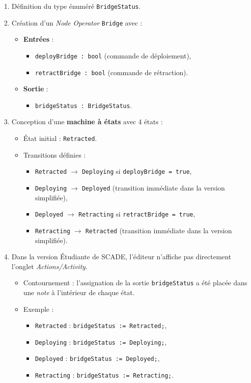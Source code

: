 \documentclass[11pt,a4paper]{report}
\begin{document}
\begin{enumerate}
  \item Définition du type énuméré \texttt{BridgeStatus}.
  \item Création d’un \textit{Node Operator} \texttt{Bridge} avec :
  \begin{itemize}
    \item \textbf{Entrées} :
      \begin{itemize}
        \item \texttt{deployBridge : bool} (commande de déploiement),
        \item \texttt{retractBridge : bool} (commande de rétraction).
      \end{itemize}
    \item \textbf{Sortie} :
      \begin{itemize}
        \item \texttt{bridgeStatus : BridgeStatus}.
      \end{itemize}
  \end{itemize}
  \item Conception d’une \textbf{machine à états} avec 4 états :
  \begin{itemize}
    \item État initial : \texttt{Retracted}.
    \item Transitions définies :
      \begin{itemize}
        \item \texttt{Retracted} $\rightarrow$ \texttt{Deploying} si \texttt{deployBridge = true},
        \item \texttt{Deploying} $\rightarrow$ \texttt{Deployed} (transition immédiate dans la version simplifiée),
        \item \texttt{Deployed} $\rightarrow$ \texttt{Retracting} si \texttt{retractBridge = true},
        \item \texttt{Retracting} $\rightarrow$ \texttt{Retracted} (transition immédiate dans la version simplifiée).
      \end{itemize}
  \end{itemize}
  \item Dans la version Étudiante de SCADE, l’éditeur n’affiche pas directement l’onglet \textit{Actions/Activity}.
  \begin{itemize}
    \item Contournement : l’assignation de la sortie \texttt{bridgeStatus} a été placée dans une \textit{note} à l’intérieur de chaque état.
    \item Exemple :
      \begin{itemize}
        \item \texttt{Retracted} : \texttt{bridgeStatus := Retracted;},
        \item \texttt{Deploying} : \texttt{bridgeStatus := Deploying;},
        \item \texttt{Deployed} : \texttt{bridgeStatus := Deployed;},
        \item \texttt{Retracting} : \texttt{bridgeStatus := Retracting;}.
      \end{itemize}
  \end{itemize}
\end{enumerate}
\end{document}
